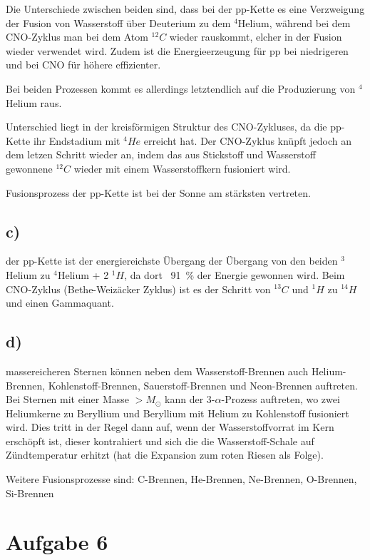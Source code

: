 Die Unterschiede zwischen beiden sind, dass bei der pp-Kette es eine Verzweigung der Fusion
von Wasserstoff über Deuterium zu dem $^4 $Helium, während bei dem CNO-Zyklus man
bei dem Atom $^{12} C$ wieder rauskommt, elcher in der Fusion wieder verwendet wird.
Zudem ist die Energieerzeugung für pp bei niedrigeren und bei CNO für höhere
effizienter.

Bei beiden Prozessen kommt es allerdings letztendlich auf die Produzierung
von $^4 $Helium raus.

\justifying Unterschied liegt in der kreisförmigen Struktur des CNO-Zykluses, da die pp-Kette ihr Endstadium mit $^4He$ erreicht hat. Der CNO-Zyklus knüpft jedoch an dem letzen Schritt wieder
an, indem das aus Stickstoff und Wasserstoff gewonnene $^{12}C$ wieder mit einem Wasserstoffkern fusioniert wird. 


\justifying Fusionsprozess der pp-Kette ist bei der Sonne am stärksten vertreten.

\subsection{c)}
\justifying der pp-Kette ist der energiereichste Übergang der Übergang von den beiden $^3$Helium zu $^4$Helium + 2 $^1H$, da dort ~\SI{91}{\percent} der Energie gewonnen wird. 
Beim CNO-Zyklus (Bethe-Weizäcker Zyklus) ist es der Schritt von $^{13}C$ und $^1H$ zu $^{14}H$ und einen Gammaquant.


\subsection{d)}
\justifying massereicheren Sternen können neben dem Wasserstoff-Brennen auch Helium-Brennen, Kohlenstoff-Brennen, Sauerstoff-Brennen und Neon-Brennen auftreten. 
Bei Sternen mit einer Masse $>M_{\odot}$ kann der 3-$\alpha$-Prozess auftreten, wo zwei Heliumkerne zu Beryllium und Beryllium mit Helium zu Kohlenstoff fusioniert wird.
Dies tritt in der Regel dann auf, wenn der Wasserstoffvorrat im Kern erschöpft ist, dieser kontrahiert und sich die die Wasserstoff-Schale auf Zündtemperatur erhitzt (hat die
Expansion zum roten Riesen als Folge).

Weitere Fusionsprozesse sind:
C-Brennen, He-Brennen, Ne-Brennen, O-Brennen, Si-Brennen


\section{Aufgabe 6}

